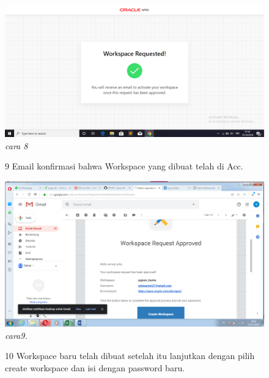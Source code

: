 \begin{enumerate}
\begin{figure}
    \begin{center}
\includegraphics[scale=0.2]{apex/apex3.png}
    \caption{\textit{cara 8}}
        \end{center}
\label{gambar}
\end{figure}

\begin{figure}
\item[9] Email konfirmasi bahwa Workspace yang dibuat telah di Acc.

    \begin{center}
\includegraphics[scale=0.2]{apex/db9.png}
    \caption{\textit{cara9.}}
        \end{center}
\label{gambar}
\end{figure}

\begin{figure}
\item[10] Workspace baru telah dibuat setelah itu lanjutkan dengan pilih create workspace dan isi dengan password baru.


\end{figure}
\end{enumerate}
